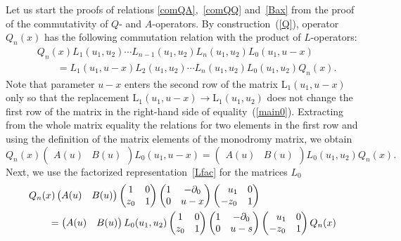 \documentclass[10pt,a4paper]{amsart}
\numberwithin{equation}{section}
\begin{document}
Let us start the proofs of relations
\eqref{comQA},~\eqref{comQQ} and~\eqref{Bax} from the proof of
the commutativity of $Q$- and $A$-operators.
By construction~(\ref{Q}), operator
$Q_n(x)$ has the following commutation relation with the
product of $L$-operators:
\begin{align}
& \nonumber
Q_n(x)
L_{1}(u_{1},u_{2})\cdots
L_{n-1}(u_{1},u_{2})
L_{n}(u_{1},u_{2})
L_{0}(u_{1},u-x) \\
& \qquad
= L_{1}(u_{1},u-x)
L_{2}(u_{1},u_{2})\cdots
L_{n}(u_{1},u_{2})
L_{0}(u_{1},u_{2}) Q_n(x).\label{main0}
\end{align}
Note that parameter $u-x$ enters the second row of the matrix $\mathrm{L}_{1}\left(u_{1},u-x\right)$ only
so that the replacement $\mathrm{L}_{1}\left(u_{1},u-x\right)\to \mathrm{L}_{1}\left(u_{1},u_{2}\right)$ does not change the first
row of the matrix in the right-hand side of equality~(\ref{main0}).
Extracting from the whole matrix equality the relations for two elements in the first row and using the definition of the matrix elements of the monodromy matrix, we obtain
\begin{equation*}
Q_n(x)
\begin{pmatrix}
A(u) & B(u)
\end{pmatrix}
L_{0}(u_{1},u-x) = \begin{pmatrix}
A(u) & B(u)
\end{pmatrix}
L_{0}(u_{1},u_{2}) Q_n(x).
\end{equation*}
Next, we use the factorized representation~\eqref{Lfac} for the matrices
$L_0$
\begin{align*}
&
Q_n(x)
\begin{pmatrix}
A(u) & B(u)
\end{pmatrix}
\begin{pmatrix}
 1 & 0 \\
 z_0 & 1 \\
\end{pmatrix}
\begin{pmatrix}
 1 & -\partial_{0} \\
 0 & u-x \\
\end{pmatrix}
\begin{pmatrix}
 \hphantom{-}u_1 & 0 \\
 -z_0 & 1 \\
\end{pmatrix} \\
& \qquad{}
=
\begin{pmatrix}
A(u) & B(u)
\end{pmatrix}
L_{0}(u_{1},u_{2})
\begin{pmatrix}
 1 & 0 \\
 z_0 & 1 \\
\end{pmatrix}
\begin{pmatrix}
 1 & -\partial_{0} \\
 0 & u-s \\
\end{pmatrix}
\begin{pmatrix}
 \hphantom{-}u_1 & 0 \\
 -z_0 & 1 \\
\end{pmatrix} Q_n(x)
\end{align*}
\end{document}
